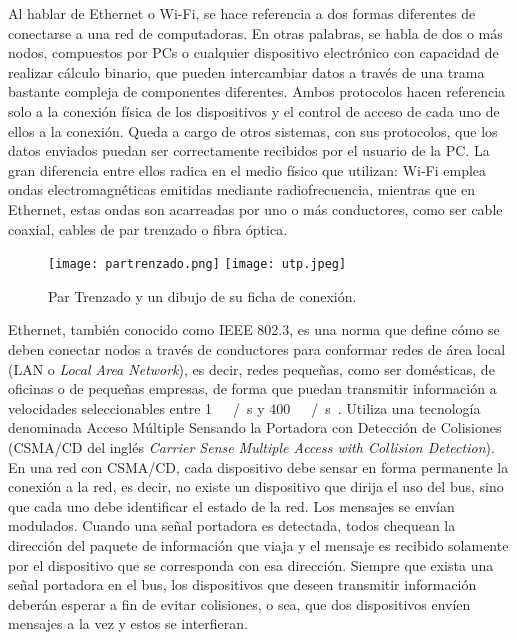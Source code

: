 Al hablar de Ethernet o Wi-Fi, se hace referencia a dos formas diferentes de conectarse a una red de computadoras. En otras palabras, se habla de dos o más nodos, compuestos por PCs o cualquier dispositivo electrónico con capacidad de realizar cálculo binario, que pueden intercambiar datos a través de una trama bastante compleja de componentes diferentes. Ambos protocolos hacen referencia solo a la conexión física de los dispositivos y el control de acceso de cada uno de ellos a la conexión. Queda a cargo de otros sistemas, con sus protocolos, que los datos enviados puedan ser correctamente recibidos por el usuario de la PC. La gran diferencia entre ellos radica en el medio físico que utilizan: Wi-Fi emplea ondas electromagnéticas emitidas mediante radiofrecuencia, mientras que en Ethernet, estas ondas son acarreadas por uno o más conductores, como ser cable coaxial, cables de par trenzado o fibra óptica.%

\begin{figure}
	\centering
	\texttt{[image: partrenzado.png]}
	\texttt{[image: utp.jpeg]}
	\caption{Par Trenzado y un dibujo de su ficha de conexión.}
	\label{fig:utp}
\end{figure}

Ethernet, también conocido como IEEE 802.3, es una norma que define cómo se deben conectar nodos a través de conductores para conformar redes de área local (LAN o {\it Local Area Network}), es decir, redes pequeñas, como ser domésticas, de oficinas o de pequeñas empresas, de forma que puedan transmitir información a velocidades seleccionables entre \SI{1}{\mega\bit\slash\second} y \SI{400}{\giga\bit\slash\second}~\cite{Ethernet2018}. Utiliza una tecnología denominada Acceso Múltiple Sensando la Portadora con Detección de Colisiones (CSMA/CD del inglés {\it Carrier Sense Multiple Access with Collision Detection}). En una red con CSMA/CD, cada dispositivo debe sensar en forma permanente la conexión a la red, es decir, no existe un dispositivo que dirija el uso del bus, sino que cada uno debe identificar el estado de la red. Los mensajes se envían modulados. Cuando una señal portadora es detectada, todos chequean la dirección del paquete de información que viaja y el mensaje es recibido solamente por el dispositivo que se corresponda con esa dirección. Siempre que exista una señal portadora en el bus, los dispositivos que deseen transmitir información deberán esperar a fin de evitar colisiones, o sea, que dos dispositivos envíen mensajes a la vez y estos se interfieran.%


